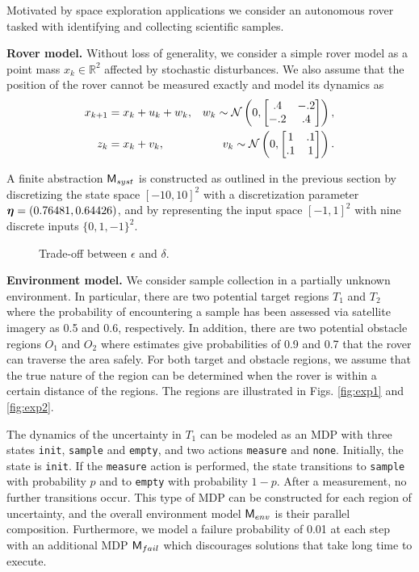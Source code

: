 
Motivated by space exploration applications we consider an autonomous rover tasked with identifying and collecting scientific samples.


\textbf{Rover model.} Without loss of generality, we consider a simple rover model as a point mass $x_k \in \mathbb{R}^2$ affected by stochastic disturbances. We also assume that the position of the rover cannot be measured exactly and model its dynamics as
\begin{equation*}
\begin{aligned}
	x_{k+1}&= x_{k} + u_k+ w_k,  & w_k \sim \mathcal{N} \left(0,\begin{bmatrix}.4&-.2\\-.2&.4\end{bmatrix}\right), \\
	z_k&= x_k+v_k, &  v_k \sim \mathcal{N} \left(0,\begin{bmatrix}1&.1\\.1&1\end{bmatrix}\right).
\end{aligned}
\end{equation*}

A finite abstraction $\mathsf{M}_{syst}$ is constructed as outlined in the previous section by discretizing the state space $[-10, 10]^2$ with a discretization parameter ${\boldsymbol{\eta}} = (0.76481, 0.64426)$, and by representing the input space $[-1,1]^2$ with nine discrete inputs $\{0, 1, -1\}^2$.

\begin{figure}
	
	\caption{Trade-off between $\epsilon$ and $\delta$.  }
\end{figure}

\textbf{Environment model.} We consider sample collection in a partially unknown environment. In particular, there are two potential target regions $T_1$ and $T_2$ where the probability of encountering a sample has been assessed via satellite imagery as 0.5 and 0.6, respectively. In addition, there are two potential obstacle regions $O_1$ and $O_2$ where estimates give probabilities of 0.9 and 0.7 that the rover can traverse the area safely. For both target and obstacle regions, we assume that the true nature of the region can be determined when the rover is within a certain distance of the regions. The regions are illustrated in Figs. \ref{fig:exp1} and \ref{fig:exp2}.

The dynamics of the uncertainty in $T_1$ can be modeled as an MDP with three states \texttt{init}, \texttt{sample} and \texttt{empty}, and two actions \texttt{measure} and \texttt{none}. Initially, the state is \texttt{init}. If the \texttt{measure} action is performed, the state transitions to \texttt{sample} with probability $p$ and to \texttt{empty} with probability $1-p$. After a measurement, no further transitions occur. This type of MDP can be constructed for each region of uncertainty, and the overall environment model $\mathsf{M}_{env}$ is their parallel composition. Furthermore, we model a failure probability of 0.01 at each step with an additional MDP $\mathsf{M}_{fail}$ which discourages solutions that take long time to execute.

